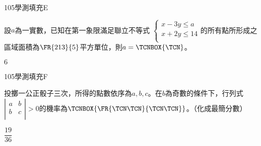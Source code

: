     \begin{QUESTION}
        \begin{ExamInfo}{105}{學測}{填充}{E}
        \end{ExamInfo}
        \begin{ExamAnsRateInfo}{31}{60}{23}{10}
        \end{ExamAnsRateInfo}
        \begin{QBODY}
            設$a$為一實數，已知在第一象限滿足聯立不等式
			$\left\{ \begin{matrix}
			   x-3y\le a  \\
			   x+2y\le 14  \\
			\end{matrix} \right.$的所有點所形成之區域面積為$\FR{213}{5}$平方單位，則$a=\TCNBOX{\TCN}$。
        \end{QBODY}
        \begin{QFROMS}
        \end{QFROMS}
        \begin{QTAGS}\end{QTAGS}
        \begin{QANS}
            $6$
        \end{QANS}
        \begin{QSOLLIST}
        \end{QSOLLIST}
        \begin{QEMPTYSPACE}
        \end{QEMPTYSPACE}
    \end{QUESTION}
    \begin{QUESTION}
        \begin{ExamInfo}{105}{學測}{填充}{F}
        \end{ExamInfo}
        \begin{ExamAnsRateInfo}{17}{39}{10}{2}
        \end{ExamAnsRateInfo}
        \begin{QBODY}
            投擲一公正骰子三次，所得的點數依序為$a,b,c$。在$b$為奇數的條件下，行列式
			$\left| \begin{matrix}
			   a & b  \\
			   b & c  \\
			\end{matrix} \right|>0$的機率為$\TCNBOX{\FR{\TCN\TCN}{\TCN\TCN}}$。（化成最簡分數）
        \end{QBODY}
        \begin{QFROMS}
        \end{QFROMS}
        \begin{QTAGS}\end{QTAGS}
        \begin{QANS}
            $\dfrac{19}{36}$
        \end{QANS}
        \begin{QSOLLIST}
        \end{QSOLLIST}
        \begin{QEMPTYSPACE}
        \end{QEMPTYSPACE}
    \end{QUESTION}
